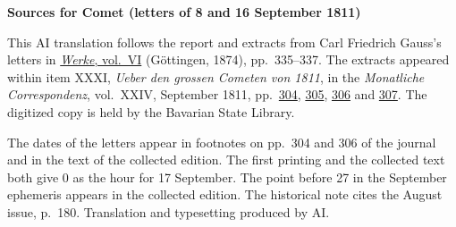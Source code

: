 \clearpage\thispagestyle{empty}
\begin{center}\textbf{Sources for Comet (letters of 8 and 16 September 1811)}\end{center}
\noindent This AI translation follows the report and extracts from Carl Friedrich Gauss’s letters in \href{https://gdz.sub.uni-goettingen.de/id/PPN236007467}{\textit{Werke}, vol.~VI} (Göttingen, 1874), pp.~335--337. The extracts appeared within item XXXI, \textit{Ueber den grossen Cometen von 1811}, in the \textit{Monatliche Correspondenz}, vol.~XXIV, September 1811, pp.~\href{https://api.digitale-sammlungen.de/iiif/image/v2/bsb10538613_00314/full/1600,/0/default.jpg}{304}, \href{https://api.digitale-sammlungen.de/iiif/image/v2/bsb10538613_00315/full/1600,/0/default.jpg}{305}, \href{https://api.digitale-sammlungen.de/iiif/image/v2/bsb10538613_00316/full/1600,/0/default.jpg}{306} and \href{https://api.digitale-sammlungen.de/iiif/image/v2/bsb10538613_00317/full/1600,/0/default.jpg}{307}. The digitized copy is held by the Bavarian State Library.
\par\smallskip\noindent The dates of the letters appear in footnotes on pp.~304 and 306 of the journal and in the text of the collected edition. The first printing and the collected text both give 0 as the hour for 17 September. The point before 27 in the September ephemeris appears in the collected edition. The historical note cites the August issue, p.~180. Translation and typesetting produced by AI.
\clearpage
